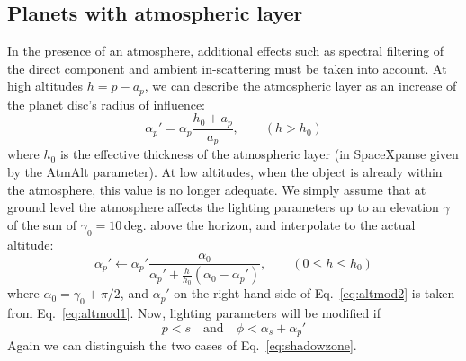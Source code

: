 \documentclass[a4paper]{article}
\begin{document}
\subsection{Planets with atmospheric layer}
In the presence of an atmosphere, additional effects such as spectral filtering of the direct component and ambient in-scattering must be taken into account.
At high altitudes $h=p-a_p$, we can describe the atmospheric layer as an increase of the planet disc's radius of influence:
\begin{equation}\label{eq:altmod1}
\alpha_p' = \alpha_p \frac{h_0 + a_p}{a_p},\qquad (h > h_0)
\end{equation}
where $h_0$ is the effective thickness of the atmospheric layer (in SpaceXpanse given by the AtmAlt parameter).
At low altitudes, when the object is already within the atmosphere, this value is no longer adequate. We simply assume that at ground level the atmosphere affects the lighting parameters up to an elevation $\gamma$ of the sun of $\gamma_0=10$\,deg. above the horizon, and interpolate to the actual altitude:
\begin{equation}\label{eq:altmod2}
\alpha_p' \leftarrow \alpha_p' \frac{\alpha_0}{\alpha_p'+\frac{h}{h_0}(\alpha_0-\alpha_p')},\qquad (0 \leq h \leq h_0)
\end{equation}
where $\alpha_0 = \gamma_0+\pi/2$, and $\alpha_p'$ on the right-hand side of Eq.~\ref{eq:altmod2} is taken from Eq.~\ref{eq:altmod1}.
Now, lighting parameters will be modified if
\begin{equation}
p < s \quad\text{and}\quad \phi < \alpha_s + \alpha_p'
\end{equation}
Again we can distinguish the two cases of Eq.~\ref{eq:shadowzone}.
\end{document}
